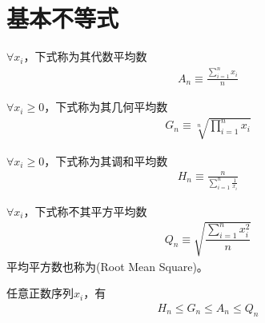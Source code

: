 
\section{基本不等式}
\label{sec:basic-inequalities}

\begin{definition}
  $\forall x_i$，下式称为其代数平均数
  \begin{align*}
    A_n\equiv\frac{\sum\limits_{i=1}^{n} x_i}{n}
  \end{align*}
\end{definition}

\begin{definition}
  $\forall x_i\ge0$，下式称为其几何平均数
  \begin{align*}
    G_n\equiv\sqrt[n]{\prod_{i=1}^{n}x_i}
  \end{align*}
\end{definition}

\begin{definition}
  $\forall x_i\ge0$，下式称为其调和平均数
  \begin{align*}
    H_n\equiv\frac{n}{\sum\limits_{i=1}^{n}\frac1{x_i}}
  \end{align*}
\end{definition}

\begin{definition}
  $\forall x_i$，下式称不其平方平均数
  \begin{align*}
    Q_n\equiv\sqrt{\dfrac{\sum\limits_{i=1}^n x_i^2}{n}}
  \end{align*}
  平均平方数也称为(Root Mean Square)。
\end{definition}

\begin{theorem}[HM-GM-AM-QM]
  任意正数序列$x_i$，有
  \begin{align*}
    H_n\le G_n\le A_n\le Q_n
  \end{align*}
\end{theorem}

